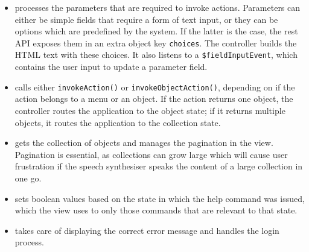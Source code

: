 \begin{itemize}
	\item {} processes the parameters that are required to invoke actions. Parameters can either be simple fields that require a form of text input, or they can be options which are predefined by the system. If the latter is the case, the \acrshort{rest} API exposes them in an extra object key \texttt{choices}. The controller builds the HTML text with these choices. It also listens to a \texttt{\$fieldInputEvent}, which contains the user input to update a parameter field.
	
	\item {} calls either \texttt{invokeAction()} or \texttt{invokeObjectAction()}, depending on if the action belongs to a menu or an object. If the action returns one object, the controller routes the application to the object state; if it returns multiple objects, it routes the application to the collection state.
	
	\item {} gets the collection of objects and manages the pagination in the view. Pagination is essential, as collections can grow large which will cause user frustration if the speech synthesiser speaks the content of a large collection in one go.
	
	\item {} sets boolean values based on the state in which the help command was issued, which the view uses to only those commands that are relevant to that state.
	
	\item {} takes care of displaying the correct error message and  handles the login process.
\end{itemize}